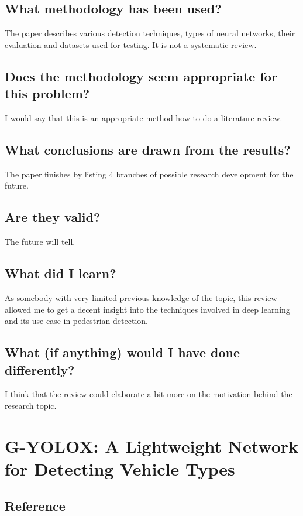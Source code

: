 \documentclass[11pt,a4paper]{article}
\begin{document}
\subsection*{What methodology has been used?}
The paper describes various detection techniques, types of neural networks, their evaluation and datasets used for testing. It is not a systematic review.

\subsection*{Does the methodology seem appropriate for this problem?}
I would say that this is an appropriate method how to do a literature review.
\subsection*{What conclusions are drawn from the results?}
The paper finishes by listing 4 branches of possible research development for the future.
\subsection*{Are they valid?}
The future will tell.
\subsection*{What did I learn?}
As somebody with very limited previous knowledge of the topic, this review allowed me to get a decent insight into the techniques involved in deep learning and its use case in pedestrian detection.
\subsection*{What (if anything) would I have done differently?}
I think that the review could elaborate a bit more on the motivation behind the research topic.
\newpage 

\section*{G-YOLOX: A Lightweight Network for Detecting Vehicle Types}
\subsection*{Reference}
\end{document}
